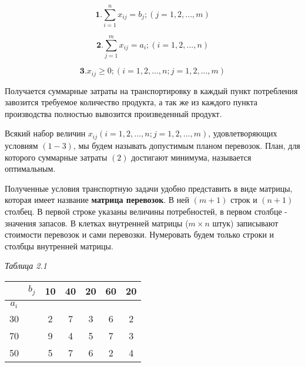\documentclass[a4paper,12pt]{article}
\begin{document}
	\[
		\textbf{1.} \sum\limits_{i=1}^n x_{ij} = b_j; (j = 1, 2, ..., m) 
	\]
	
	\[
		\textbf{2.} \sum\limits_{j=1}^m x_{ij} = a_i; (i = 1, 2, ..., n)
	\]
	
	\[
		\textbf{3.} x_{ij} \geqslant 0; (i = 1, 2, ..., n; j = 1, 2, ..., m)
	\]

	Получается суммарные затраты на транспортировку в каждый пункт потребления завозится требуемое количество продукта, а так же из каждого пункта производства полностью вывозится произведенный продукт.
	
	Всякий набор величин $x_{ij} (i = 1, 2, ..., n; j = 1, 2, ..., m)$, удовлетворяющих условиям $(1-3)$, мы будем называть допустимым планом перевозок. План, для которого суммарные затраты $(2)$ достигают минимума, называется оптимальным.
	
	Полученные условия транспортную задачи удобно представить в виде матрицы, которая имеет название \textbf{матрица перевозок}. В ней $(m + 1)$ строк и $(n + 1)$ столбец. В первой строке указаны величины потребностей, в первом столбце - значения запасов. В клетках внутренней матрицы ($m \times n$ штук) записывают стоимости перевозок и сами перевозки. Нумеровать будем только строки и столбцы внутренней матрицы.
	
	\begin{flushright}
		\textit{Таблица 2.1}
	\end{flushright}
	\begin{center}
		\begin{tabular}{c|cccccc}
			\cline{2-7}
			& \multicolumn{1}{c|}{$b_j$} & \multicolumn{1}{c|}{10} & \multicolumn{1}{c|}{40} & \multicolumn{1}{c|}{20} & \multicolumn{1}{c|}{60} & \multicolumn{1}{c|}{20} \\ \hline
			\multicolumn{1}{|c|}{$a_i$} &  &  &  &  &  &  \\ \cline{1-1} \cline{3-7} 
			\multicolumn{1}{|c|}{30} & \multicolumn{1}{c|}{} & \multicolumn{1}{c|}{2} & \multicolumn{1}{c|}{7} & \multicolumn{1}{c|}{3} & \multicolumn{1}{c|}{6} & \multicolumn{1}{c|}{2} \\ \cline{1-1} \cline{3-7} 
			\multicolumn{1}{|c|}{70} & \multicolumn{1}{c|}{} & \multicolumn{1}{c|}{9} & \multicolumn{1}{c|}{4} & \multicolumn{1}{c|}{5} & \multicolumn{1}{c|}{7} & \multicolumn{1}{c|}{3} \\ \cline{1-1} \cline{3-7} 
			\multicolumn{1}{|c|}{50} & \multicolumn{1}{c|}{} & \multicolumn{1}{c|}{5} & \multicolumn{1}{c|}{7} & \multicolumn{1}{c|}{6} & \multicolumn{1}{c|}{2} & \multicolumn{1}{c|}{4} \\ \cline{1-1} \cline{3-7} 
		\end{tabular}
	\end{center}
\end{document}
